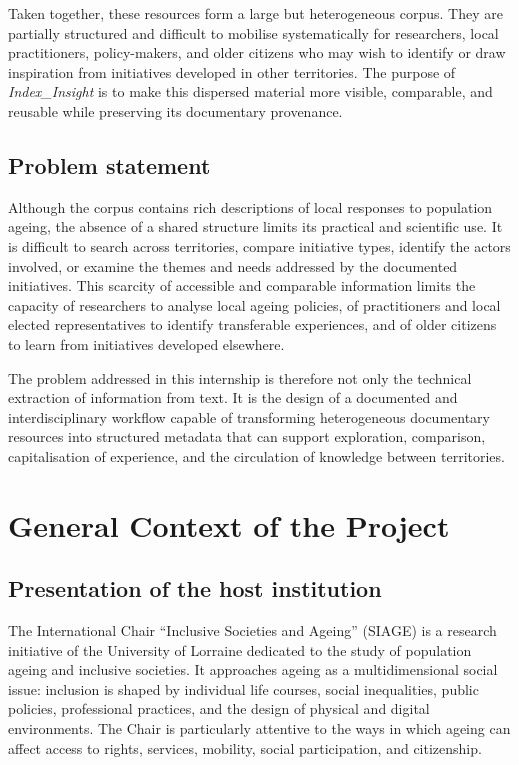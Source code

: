 Taken together, these resources form a large but heterogeneous corpus. They are
partially structured and difficult to mobilise systematically for researchers,
local practitioners, policy-makers, and older citizens who may wish to identify or
draw inspiration from initiatives developed in other territories. The purpose of
\textit{Index\_Insight} is to make this dispersed material more visible,
comparable, and reusable while preserving its documentary provenance.

\section{Problem statement}

Although the corpus contains rich descriptions of local responses to population
ageing, the absence of a shared structure limits its practical and scientific use.
It is difficult to search across territories, compare initiative types, identify the
actors involved, or examine the themes and needs addressed by the documented
initiatives. This scarcity of accessible and comparable information limits the
capacity of researchers to analyse local ageing policies, of practitioners and local
elected representatives to identify transferable experiences, and of older citizens
to learn from initiatives developed elsewhere.

The problem addressed in this internship is therefore not only the technical
extraction of information from text. It is the design of a documented and
interdisciplinary workflow capable of transforming heterogeneous documentary
resources into structured metadata that can support exploration, comparison,
capitalisation of experience, and the circulation of knowledge between territories.

\chapter{General Context of the Project}

\section{Presentation of the host institution}

The International Chair ``Inclusive Societies and Ageing'' (SIAGE) is a research
initiative of the University of Lorraine dedicated to the study of population ageing
and inclusive societies. It approaches ageing as a multidimensional social issue:
inclusion is shaped by individual life courses, social inequalities, public policies,
professional practices, and the design of physical and digital environments. The
Chair is particularly attentive to the ways in which ageing can affect access to
rights, services, mobility, social participation, and citizenship.

